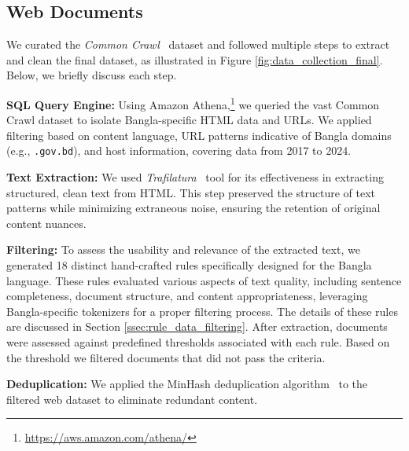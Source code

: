 

\subsection{Web Documents}
We curated the \textit{Common Crawl}~\cite{raffel2020exploring} dataset and followed multiple steps to extract and clean the final dataset, as illustrated in Figure \ref{fig:data_collection_final}. Below, we briefly discuss each step. 

\noindent \textbf{SQL Query Engine:} Using Amazon Athena,\footnote{\url{https://aws.amazon.com/athena/}} we queried the vast Common Crawl dataset to isolate Bangla-specific HTML data and URLs. We applied filtering based on content language, URL patterns indicative of Bangla domains (e.g., \texttt{.gov.bd}), and host information, covering data from 2017 to 2024.  

\noindent \textbf{Text Extraction:} We used \textit{Trafilatura}~\cite{barbaresi-2021-trafilatura} tool for its effectiveness in extracting structured, clean text from HTML. This step preserved the structure of text patterns while minimizing extraneous noise, ensuring the retention of original content nuances.

\noindent \textbf{Filtering:} To assess the usability and relevance of the extracted text, we generated 18 distinct hand-crafted rules specifically designed for the Bangla language. These rules evaluated various aspects of text quality, including sentence completeness, document structure, and content appropriateness, leveraging Bangla-specific tokenizers for a proper filtering process. The details of these rules are discussed in Section \ref{ssec:rule_data_filtering}. After extraction, documents were assessed against predefined thresholds associated with each rule. Based on the threshold we filtered documents that did not pass the criteria. 

\noindent \textbf{Deduplication:} We applied the MinHash deduplication algorithm~\cite{kocetkov2022stack} to the filtered web dataset to eliminate redundant content.  

